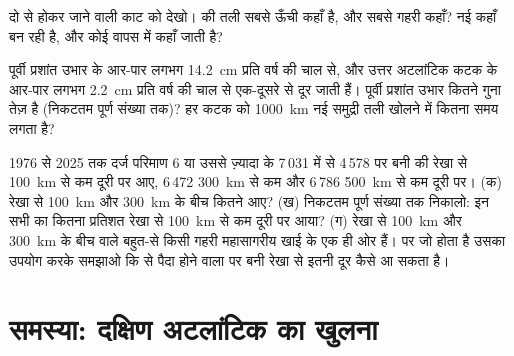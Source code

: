 \begin{exercise}[$\star\star$]\label{exo:g7:plate-tectonics:10}
दो  से होकर जाने वाली काट को देखो।  की तली सबसे ऊँची कहाँ
है, और सबसे गहरी कहाँ? नई  कहाँ बन रही है, और कोई  वापस  में
कहाँ जाती है?
\end{exercise}

\begin{exercise}[$\star\star\star$]\label{exo:g7:plate-tectonics:11}
पूर्वी प्रशांत उभार के आर-पार  लगभग \qty{14.2}{cm} प्रति वर्ष की चाल से,
और उत्तर अटलांटिक कटक के आर-पार लगभग \qty{2.2}{cm} प्रति वर्ष की चाल से
एक-दूसरे से दूर जाती हैं। पूर्वी प्रशांत उभार कितने गुना तेज़ है (निकटतम पूर्ण
संख्या तक)? हर कटक को \qty{1000}{km} नई समुद्री तली खोलने में कितना समय
लगता है?
\end{exercise}

\begin{exercise}[$\star\star\star$]\label{exo:g7:plate-tectonics:12}
1976 से 2025 तक दर्ज परिमाण 6 या उससे ज़्यादा के 7\,031  में से
4\,578  पर बनी  की रेखा से \qty{100}{km} से कम दूरी पर आए,
6\,472 \qty{300}{km} से कम और 6\,786 \qty{500}{km} से कम दूरी
पर।
(क) रेखा से \qty{100}{km} और \qty{300}{km} के बीच कितने आए? (ख) निकटतम पूर्ण
संख्या तक निकालो: इन सभी  का कितना प्रतिशत रेखा से \qty{100}{km} से कम
दूरी पर आया? (ग) रेखा से \qty{100}{km} और \qty{300}{km} के बीच वाले बहुत-से
 किसी गहरी महासागरीय खाई के एक ही ओर हैं।  पर जो होता है
उसका उपयोग करके समझाओ कि  से पैदा होने वाला   पर बनी
रेखा से इतनी दूर कैसे आ सकता
है।
\end{exercise}

\section{समस्या: दक्षिण अटलांटिक का खुलना}

